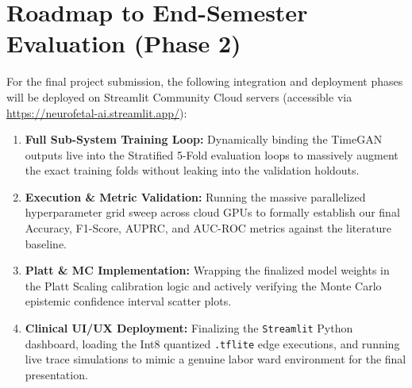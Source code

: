 \documentclass[12pt,a4paper]{report}
\begin{document}
\section{Roadmap to End-Semester Evaluation (Phase 2)}
For the final project submission, the following integration and deployment phases will be deployed on Streamlit Community Cloud servers (accessible via \url{https://neurofetal-ai.streamlit.app/}):
\begin{enumerate}
    \item \textbf{Full Sub-System Training Loop:} Dynamically binding the TimeGAN outputs live into the Stratified 5-Fold evaluation loops to massively augment the exact training folds without leaking into the validation holdouts.
    \item \textbf{Execution \& Metric Validation:} Running the massive parallelized hyperparameter grid sweep across cloud GPUs to formally establish our final Accuracy, F1-Score, AUPRC, and AUC-ROC metrics against the literature baseline.
    \item \textbf{Platt \& MC Implementation:} Wrapping the finalized model weights in the Platt Scaling calibration logic and actively verifying the Monte Carlo epistemic confidence interval scatter plots.
    \item \textbf{Clinical UI/UX Deployment:} Finalizing the \texttt{Streamlit} Python dashboard, loading the Int8 quantized \texttt{.tflite} edge executions, and running live trace simulations to mimic a genuine labor ward environment for the final presentation.
\end{enumerate}
\end{document}
